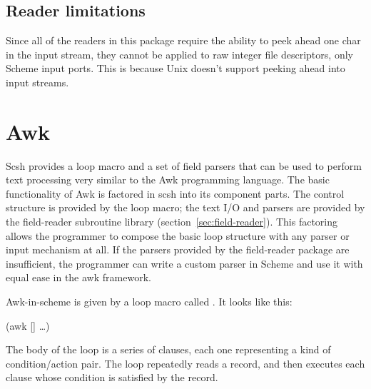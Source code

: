     
\subsection{Reader limitations}
Since all of the readers in this package require the ability to peek
ahead one char in the input stream, they cannot be applied to raw 
integer file descriptors, only Scheme input ports. This is because
Unix doesn't support peeking ahead into input streams.



\section{Awk}
\label{sec:awk}

Scsh provides a loop macro and a set of field parsers that can
be used to perform text processing very similar to the Awk programming
language.
The basic functionality of Awk is factored in scsh into its component
parts.
The control structure is provided by the  loop macro;
the text I/O and parsers are provided by the field-reader subroutine library
(section~\ref{sec:field-reader}).
This factoring allows the programmer to compose the basic loop structure
with any parser or input mechanism at all.
If the parsers provided by the field-reader package are insufficient,
the programmer can write a custom parser in Scheme and use it with
equal ease in the awk framework.

Awk-in-scheme is given by a loop macro called . It looks like
this:
\begin{code}\cdmath
(awk  
     {\rm[]} 
   \ldots)\end{code}

The body of the loop is a series of clauses, each one representing
a kind of condition/action pair. The loop repeatedly reads a record,
and then executes each clause whose condition is satisfied by the record.

